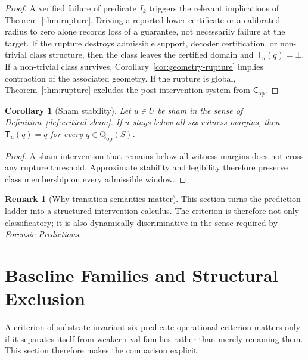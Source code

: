 \documentclass[11pt,a4paper]{article}
\newtheorem{corollary}[theorem]{Corollary}
\theoremstyle{definition}
\newtheorem{remark}[theorem]{Remark}
\newcommand{\Cop}{\mathsf{C}_{\mathrm{op}}}
\newcommand{\Qop}{\mathrm{Q}_{\mathrm{op}}}
\begin{document}
\begin{proof}
A verified failure of predicate $I_k$ triggers the relevant implications of Theorem~\ref{thm:rupture}. Driving a reported lower certificate or a calibrated radius to zero alone records loss of a guarantee, not necessarily failure at the target. If the rupture destroys admissible support, decoder certification, or non-trivial class structure, then the class leaves the certified domain and $\mathsf{T}_u(q)=\bot$. If a non-trivial class survives, Corollary~\ref{cor:geometry-rupture} implies contraction of the associated geometry. If the rupture is global, Theorem~\ref{thm:rupture} excludes the post-intervention system from $\Cop$.
\end{proof}

\begin{corollary}[Sham stability]\label{cor:sham}
Let $u \in U$ be sham in the sense of Definition~\ref{def:critical-sham}. If $u$ stays below all six witness margins, then $\mathsf{T}_u(q)=q$ for every $q \in \Qop(S)$.
\end{corollary}

\begin{proof}
A sham intervention that remains below all witness margins does not cross any rupture threshold. Approximate stability and legibility therefore preserve class membership on every admissible window.
\end{proof}

\begin{remark}[Why transition semantics matter]
This section turns the prediction ladder into a structured intervention calculus. The criterion is therefore not only classificatory; it is also dynamically discriminative in the sense required by \textit{Forensic Predictions}.
\end{remark}
\section{Baseline Families and Structural Exclusion}
A criterion of substrate-invariant six-predicate operational criterion matters only if it separates itself from weaker rival families rather than merely renaming them. This section therefore makes the comparison explicit.
\end{document}
